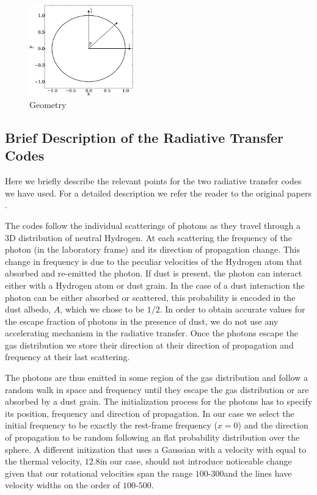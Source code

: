 \documentclass{emulateapj}
\newcommand{\ly}{{\ifmmode{{\rm Ly}\alpha~}\else{Ly$\alpha$~}\fi}}
\newcommand{\kms}{{\ifmmode{{\mathrm{\,km\ s}^{-1}}}\else{\,km~s$^{-1}$}\fi}}
\begin{document}
\begin{figure}
\begin{center}
  \includegraphics[width=0.4\textwidth]{f8.eps}
\end{center}
\caption{Geometry
    \label{fig:CentralSpec}}  
\end{figure}


\subsection{Brief Description of the Radiative Transfer Codes}

Here we briefly describe the relevant points for the two radiative
transfer codes we have used. For a detailed description we refer the
reader to the original papers \cite{CLARA,DijkstraKramer}.

The codes follow the individual scatterings of \ly photons as they
travel through a 3D distribution of neutral Hydrogen. At each
scattering the frequency of the photon (in the laboratory frame) and
its direction of propagation change. This change in frequency is due
to the peculiar velocities of the Hydrogen atom that absorbed and
re-emitted the photon. If dust is present, the photon can interact
either with a Hydrogen atom or dust grain. In the case of a dust
interaction the photon can be either absorbed or scattered, this
probability is encoded in the dust albedo, $A$, which we chose to be
$1/2$. In order to obtain accurate values for the escape fraction of
photons in the presence of dust, we do not use any accelerating
mechanism in the radiative transfer. Once the photons escape the gas
distribution we store their direction at their direction of
propagation and frequency at their last scattering.

The photons are thus emitted in some region of the gas distribution
and follow a random walk in space and frequency until they escape the
gas distribution or are absorbed by a dust grain. The initialization
process for the \ly photons has to specify its position, frequency and
direction of propagation. In our case we select the initial frequency
to be exactly the \ly rest-frame frequency ($x=0$) and the direction of
propagation to be random following an flat probability distribution
over the sphere. A different initization that uses a Gaussian with a
velocity with equal to the thermal velocity, $12.8$\kms in our case,
should not introduce noticeable change given that our rotational
velocities span the range $100$-$300$\kms and the lines have velocity
widths on the order of $100$-$500$\kms.
\end{document}
